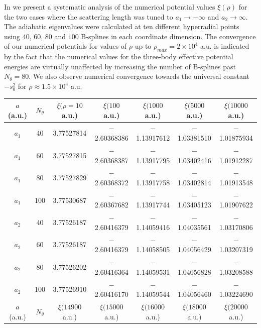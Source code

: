 In  we present a systematic analysis of the numerical potential values $\xi(\rho)$ for the two cases where the scattering length was tuned to $a_1 \rightarrow -\infty$ and $a_2 \rightarrow \infty$. The adiabatic eigenvalues were calculated at ten different hyperradial points using $40$, $60$, $80$ and $100$ B-splines in each coordinate dimension. The convergence of our numerical potentials for values of $\rho$ up to $\rho_{max} = 2 \times 10^4$ a.u. is indicated by the fact that the numerical values for the three-body effective potential energies are virtually unaffected by increasing the number of B-splines past $N_{\theta}=80$. We also observe numerical convergence towards the universal constant $-s_0^2$ for $\rho \approx 1.5 \times 10^4$ a.u. 

\begin{table}[h!]
	\centering
	\footnotesize
	\begin{adjustwidth}{-0.1cm}{}
		\tabcolsep=0.10cm
		\begin{tabular}{||c c c c c c c||} 
			\hline
			$a$ (a.u.) & $N_{\theta}$ & $\xi(\rho = 10 $ a.u.) & $\xi(100 $ a.u.) & $\xi(1000 $ a.u.) & $\xi(5000 $ a.u.) & $\xi(10000 $ a.u.)  \Tstrut\Bstrut \\ [0.7ex]
			\hline\hline  \Tstrut\Bstrut 
			$a_1$   & 40  & 3.77527814 & $-$2.60368386 & $-$1.13917612 & $-$1.03381510& $-$1.01875934 \\
			$a_1$   & 60  & 3.77527815 & $-$2.60368387 & $-$1.13917795 & $-$1.03402416& $-$1.01912287\\
			$a_1$   & 80  & 3.77527829 & $-$2.60368372 & $-$1.13917758 & $-$1.03402814 & $-$1.01913548 \\
			$a_1$   & 100  & 3.77530687 & $-$2.60367682 & $-$1.13917744 & $-$1.03405123 & $-$1.01907622 \\ [0.5ex]
			\hline \Tstrut\Bstrut 
			$a_2$   & 40  & 3.77526187 & $-$2.60416379 & $-$1.14059416 & $-$1.04035561 & $-$1.03170806 \\
			$a_2$   & 60  & 3.77526187 & $-$2.60416379 & $-$1.14058505 & $-$1.04056429 & $-$1.03207319 \\
			$a_2$   & 80  & 3.77526202 & $-$2.60416364 & $-$1.14059531 & $-$1.04056828 & $-$1.03208588 \\
			$a_2$   & 100  & 3.77526910 & $-$2.60416170 & $-$1.14059544 & $-$1.04056460 & $-$1.03224690 \\ [0.7ex] 
			\hline
			\hline
			$a$ (a.u.) & $N_{\theta}$ & $\xi(14900 $ a.u.) & $\xi(15000 $ a.u.) & $\xi(16000 $ a.u.) & $\xi(18000 $ a.u.) & $\xi(20000 $ a.u.)  \Tstrut\Bstrut \\ [0.7ex]

\end{tabular}
\end{adjustwidth}
\end{table}
